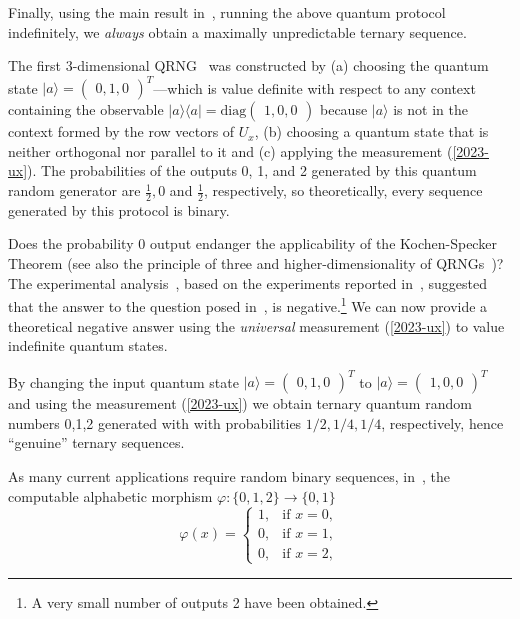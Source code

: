 \documentclass[%
 reprint,
 superscriptaddress,
 showpacs,
 showkeys,
 nofootinbib,
  amsmath,amssymb,
 pra,
  longbibliography,
  floatfix,
 ]{revtex4-2}
\theoremstyle{definition}
\begin{document}
Finally, using the main result in~\cite{acs-2015-info6040773}, running the above quantum protocol indefinitely, we {\it always} obtain a maximally unpredictable ternary sequence.


The first 3-dimensional QRNG~\cite{2012-incomput-proofsCJ} was constructed by (a)
choosing the quantum state $\vert a \rangle=\begin{pmatrix}0,1,0
\end{pmatrix}^T$---which is value definite with respect to any context containing the observable $\vert a \rangle \langle a\vert = \text{diag}\begin{pmatrix}1,0,0
\end{pmatrix}$ because $\vert a \rangle$ is not in the context formed by the row vectors of $U_{x}$, (b)  choosing a quantum state that is neither orthogonal nor parallel to
it and (c)  applying the measurement (\ref{2023-ux}).  The probabilities of the outputs 0, 1, and 2 generated by this quantum random generator are $\frac{1}{2},0  $  and $\frac{1}{2}$,  respectively, so theoretically, every sequence generated by this protocol is binary.

 Does the probability 0 output
 endanger the applicability of the Kochen-Specker Theorem (see also the
 principle of three and higher-dimensionality of QRNGs~\cite{svozil-2009-howto})? The experimental analysis~\cite{Abbott_2019}, based on the experiments reported in~\cite{Kulikov2017Dec}, suggested that the answer to the question posed in~\cite{Arkady_Fedorov-pc},  is negative.\footnote{A very small number of outputs 2 have been obtained.} We can now provide a theoretical negative answer using the {\it universal} measurement (\ref{2023-ux}) to value indefinite quantum states.






By  changing the input quantum state $\vert a \rangle = \begin{pmatrix} 0, 1 , 0  \end{pmatrix}^T$
  to $\vert a \rangle = \begin{pmatrix} 1 , 0 , 0 \end{pmatrix}^T$ and using the  measurement (\ref{2023-ux})
 we obtain ternary quantum random numbers 0,1,2 generated with with probabilities $1/2,1/4,1/4$, respectively,  hence
  ``genuine'' ternary sequences.

 As many current applications require random binary sequences, in~\cite{RSPA23},
 the computable  alphabetic morphism $\varphi \colon \{0,1,2\} \rightarrow \{0,1\}$
 \begin{equation}
 \varphi(x)=
 \begin{cases}1,&\text{if }x=0,
 \\0,&\text{if }x=1,
 \\0, &\text{if } x=2,\end{cases}
\label{2023-alphabeticmorphism}
 \end{equation}
\end{document}

